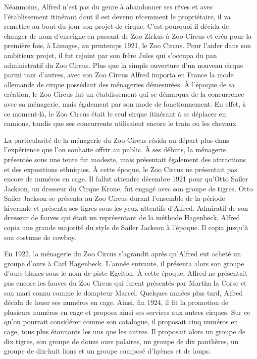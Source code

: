 Néanmoins, Alfred n’est pas du genre à abandonner ses rêves et avec l'établissement itinérant dont il est devenu récemment le propriétaire, il va remettre au bout du jour son projet de cirque. C’est pourquoi il décida de changer de nom d’enseigne en passant de Zoo Zirkus à Zoo Circus et créa pour la première fois, à Limoges, au printemps 1921, le Zoo Circus. Pour l’aider dans son ambitieux projet, il fut rejoint par son frère Jules qui s’occupa du pan administratif du Zoo Circus. Plus que la simple ouverture d’un nouveau cirque parmi tant d’autres, avec son Zoo Circus Alfred importa en France la mode allemande de cirque possédant des ménageries démesurées. À l’époque de sa création, le Zoo Circus fut un établissement qui se démarqua de la concurrence avec sa ménagerie, mais également par son mode de fonctionnement. En effet, à ce moment-là, le Zoo Circus était le seul cirque itinérant à se déplacer en camions, tandis que ses concurrents utilisaient encore le train ou les chevaux.

La particularité de la ménagerie du Zoo Circus résida au départ plus dans l’expérience que l'on souhaite offrir au public. À ses débuts, la ménagerie présentée sous une tente fut modeste, mais présentait également des attractions et des expositions ethniques. À cette époque, le Zoo Circus ne présentait pas encore de numéros en cage. Il fallut attendre décembre 1921 pour qu’Otto Sailer Jackson, un dresseur du Cirque Krone, fut engagé avec son groupe de tigres. Otto Sailer Jackson se présenta au Zoo Circus durant l’ensemble de la période hivernale et présenta ses tigres sous les yeux attentifs d’Alfred. Admiratif de son dresseur de fauves qui était un représentant de la méthode Hagenbeck, Alfred copia une grande majorité du style de Sailer Jackson à l’époque. Il copia jusqu’à son costume de cowboy.

En 1922, la ménagerie du Zoo Circus s’agrandit après qu’Alfred eut acheté un groupe d’ours à Carl Hagenbeck. L’année suivante, il présenta alors son groupe d’ours blancs sous le nom de piste Egelton. À cette époque, Alfred ne présentait pas encore les fauves du Zoo Circus qui furent présentés par Martha la Corse et son mari connu comme le dompteur Marcel. Quelques années plus tard, Alfred décida de louer ses numéros en cage. Ainsi, fin 1924, il fit la promotion de plusieurs numéros en cage et proposa ainsi ses services aux autres cirques. Sur ce qu’on pourrait considérer comme son catalogue, il proposait cinq numéros en cage, tous plus étonnants les uns que les autres. Il proposait alors un groupe de dix tigres, son groupe de douze ours polaires, un groupe de dix panthères, un groupe de dix-huit lions et un groupe composé d’hyènes et de loups. 

